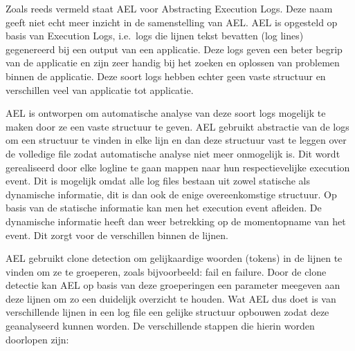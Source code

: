 Zoals reeds vermeld staat AEL voor Abstracting Execution Logs. Deze naam geeft niet echt meer inzicht in de samenstelling van AEL. AEL is opgesteld op basis van Execution Logs, i.e.\ logs die lijnen tekst bevatten (log lines) gegenereerd bij een output van een applicatie. Deze logs geven een beter begrip van de applicatie en zijn zeer handig bij het zoeken en oplossen van problemen binnen de applicatie. Deze soort logs hebben echter geen vaste structuur en verschillen veel van applicatie tot applicatie.

AEL is ontworpen om automatische analyse van deze soort logs mogelijk te maken door ze een vaste structuur te geven. AEL gebruikt abstractie van de logs om een structuur te vinden in elke lijn en dan deze structuur vast te leggen over de volledige file zodat automatische analyse niet meer onmogelijk is. Dit wordt gerealiseerd door elke logline te gaan mappen naar hun respectievelijke execution event. Dit is mogelijk omdat alle log files bestaan uit zowel statische als dynamische informatie, dit is dan ook de enige overeenkomstige structuur. Op basis van de statische informatie kan men het execution event afleiden. De dynamische informatie heeft dan weer betrekking op de momentopname van het event. Dit zorgt voor de verschillen binnen de lijnen. 

AEL gebruikt clone detection om gelijkaardige woorden (tokens) in de lijnen te vinden om ze te groeperen, zoals bijvoorbeeld: fail en failure. Door de clone detectie kan AEL op basis van deze groeperingen een parameter meegeven aan deze lijnen om zo een duidelijk overzicht te houden. Wat AEL dus doet is van verschillende lijnen in een log file een gelijke structuur opbouwen zodat deze geanalyseerd kunnen worden. De verschillende stappen die hierin worden doorlopen zijn:

